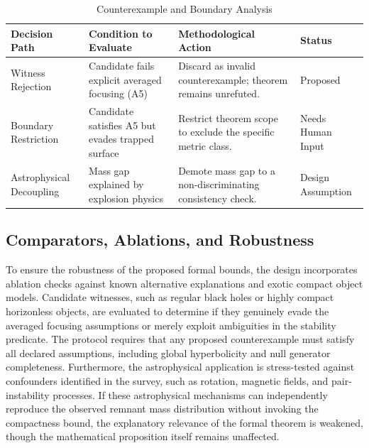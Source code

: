\documentclass[conference]{IEEEtran}
\begin{document}
\begin{table}[htbp]
\centering
\footnotesize
\setlength{\tabcolsep}{3pt}
\renewcommand{\arraystretch}{1.12}
\caption{Counterexample and Boundary Analysis}
\label{tab:study-design-and-methods-counterexample-criteria}
\begin{tabular}{|p{}|p{}|p{}|p{}|}
\hline
Decision Path & Condition to Evaluate & Methodological Action & Status \\\hline
Witness Rejection & Candidate fails explicit averaged focusing (A5) & Discard as invalid counterexample; theorem remains unrefuted. & Proposed \\\hline
Boundary Restriction & Candidate satisfies A5 but evades trapped surface & Restrict theorem scope to exclude the specific metric class. & Needs Human Input \\\hline
Astrophysical Decoupling & Mass gap explained by explosion physics & Demote mass gap to a non-discriminating consistency check. & Design Assumption \\\hline
\end{tabular}
\end{table}

\subsection{Comparators, Ablations, and Robustness}
To ensure the robustness of the proposed formal bounds, the design incorporates ablation checks against known alternative explanations and exotic compact object models. Candidate witnesses, such as regular black holes or highly compact horizonless objects, are evaluated to determine if they genuinely evade the averaged focusing assumptions or merely exploit ambiguities in the stability predicate. The protocol requires that any proposed counterexample must satisfy all declared assumptions, including global hyperbolicity and null generator completeness. Furthermore, the astrophysical application is stress-tested against confounders identified in the survey, such as rotation, magnetic fields, and pair-instability processes. If these astrophysical mechanisms can independently reproduce the observed remnant mass distribution without invoking the compactness bound, the explanatory relevance of the formal theorem is weakened, though the mathematical proposition itself remains unaffected.
\end{document}
